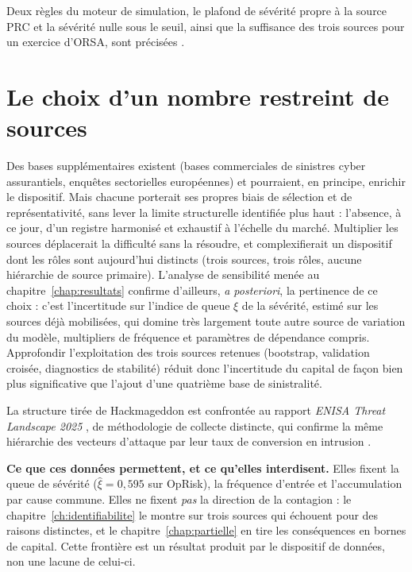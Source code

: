 Deux règles du moteur de simulation, le plafond de sévérité propre à la source PRC et la
sévérité nulle sous le seuil, ainsi que la suffisance des trois sources pour un exercice
d'ORSA, sont précisées \matcomp.


\section{Le choix d'un nombre restreint de sources}

Des bases
supplémentaires existent (bases commerciales de sinistres cyber assurantiels,
enquêtes sectorielles européennes) et pourraient, en principe, enrichir le
dispositif. Mais chacune porterait ses propres biais de sélection et de
représentativité, sans lever la limite structurelle identifiée plus haut :
l'absence, à ce jour, d'un registre harmonisé et exhaustif à
l'échelle du marché. Multiplier les sources déplacerait la difficulté sans la
résoudre, et complexifierait un dispositif dont les rôles sont aujourd'hui distincts (trois
sources, trois rôles, aucune hiérarchie de \og source primaire\fg{}). L'analyse de sensibilité menée
au chapitre~\ref{chap:resultats} confirme d'ailleurs, \emph{a posteriori}, la pertinence de ce choix :
c'est l'incertitude sur l'indice de queue $\xi$ de la sévérité, estimé sur
les sources déjà mobilisées, qui domine très largement toute autre source
de variation du modèle, multipliers de fréquence et paramètres de dépendance
compris. Approfondir l'exploitation des trois sources retenues (bootstrap,
validation croisée, diagnostics de stabilité) réduit donc l'incertitude du
capital de façon bien plus significative que l'ajout d'une quatrième base de
sinistralité.



La structure tirée de Hackmageddon est confrontée au rapport \emph{ENISA Threat Landscape 2025}
\citep{enisa2025}, de méthodologie de collecte distincte, qui confirme la même hiérarchie des
vecteurs d'attaque par leur taux de conversion en intrusion \matcomp.


\begin{cle}
\textbf{Ce que ces données permettent, et ce qu'elles interdisent.} Elles fixent la queue de
sévérité ($\hat\xi = 0{,}595$ sur OpRisk), la fréquence d'entrée et l'accumulation par cause
commune. Elles ne fixent \emph{pas} la direction de la contagion : le
chapitre~\ref{ch:identifiabilite} le montre sur trois sources qui échouent pour des raisons
distinctes, et le
chapitre~\ref{chap:partielle} en tire les conséquences en bornes de capital. Cette frontière
est un résultat produit par le dispositif de données, non une lacune de celui-ci.
\end{cle}

